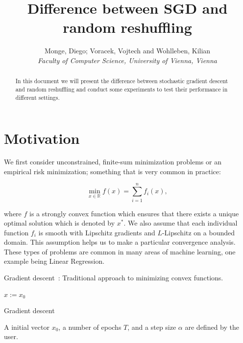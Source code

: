 \documentclass[10pt,conference,compsocconf]{IEEEtran}
\begin{document}
\title{Difference between SGD and random reshuffling}

\author{
  Monge, Diego; Voracek, Vojtech and Wohlleben, Kilian\\
  \textit{Faculty of Computer Science, University of Vienna, Vienna}
}

\maketitle

\begin{abstract}
In this document we will present the difference between stochastic gradient descent and random reshuffling and conduct some experiments to test their performance in different settings.
\end{abstract}

\section{Motivation}
\label{sec:motivation}
\medskip

We first consider unconstrained, finite-sum minimization problems or an
empirical risk minimization; something that is very common in practice:

\begin{equation}\label{eq:finite-sum}
\min_{x \in \mathbb{R}} f(x) = \sum_{i = 1}^n f_i(x),
\end{equation}


\noindent where $f$ is a strongly convex function which ensures that there
exists a unique optimal solution which is denoted by $x^*$. We also assume
that each individual function $f_i$ is smooth with Lipschitz gradients and
\mbox{$L$-Lipschitz} on a bounded domain. This assumption helps us to make
a particular convergence analysis.
These types of problems are common in many areas of machine learning, one example being Linear Regression.

\medskip

Gradient descent~\cite{GD}:
Traditional approach to minimizing convex functions.

\begin{algorithm}
\SetAlgoLined

  $x:= x_0$ \\
 
 \caption{Gradient descent}
\end{algorithm}
\noindent A initial vector $x_0$, a number of epochs $T$, and
a step size $\alpha$ are defined by the user.
\end{document}
